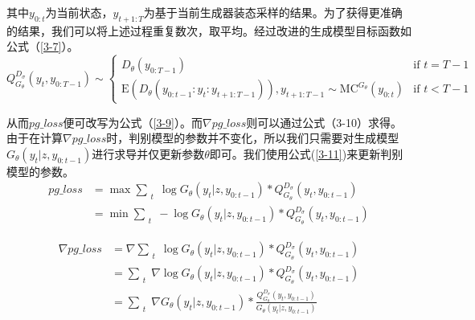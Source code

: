 其中$y_{0:t}$为当前状态，$y_{t+1:T}$为基于当前生成器装态采样的结果。为了获得更准确的结果，我们可以将上述过程重复数次，取平均。经过改进的生成模型目标函数如公式（\ref{3-7}）。
\begin{equation}\label{3-7}
Q_{G_\theta}^{D_\sigma}(y_t,y_{0:T-1})\sim 
\begin{cases}
    D_\theta(y_{0:T-1}) & \text{if } t =T-1 \\
    \mathrm{E}(D_\theta(y_{0:t-1}:y_t:y_{t+1:T-1})),y_{t+1:T-1}\sim \mathrm{MC}^{G_\theta}(y_{0:t}) & \text{if }t<T-1
\end{cases}
\end{equation}

从而$pg\_loss$便可改写为公式（\ref{3-9}）。而$\nabla pg\_loss$则可以通过公式（3-10）求得。由于在计算$\nabla pg\_loss$时，判别模型的参数并不变化，所以我们只需要对生成模型$G_\theta (y_t|z,y_{0:t-1})$进行求导并仅更新参数$\theta$即可。我们使用公式(\ref{3-11})来更新判别模型的参数。
\begin{align}\label{3-9}
    pg\_loss &=\mathop{max}\sum_{\substack{t}}\log G_\theta (y_t|z,y_{0:t-1})*Q_{G_\theta}^{D_\sigma} (y_t,y_{0:t-1})\\
             &=\mathop{min}\sum_{\substack{t}}-\log G_\theta (y_t|z,y_{0:t-1})*Q_{G_\theta}^{D_\sigma} (y_t,y_{0:t-1})
\end{align}

\begin{align}\label{3-10}
    \nabla pg\_loss &= \nabla \sum_{\substack{t}}\log G_\theta (y_t|z,y_{0:t-1})*Q_{G_\theta}^{D_\sigma} (y_t,y_{0:t-1})\\
                    &= \sum_{\substack{t}}\nabla\log G_\theta (y_t|z,y_{0:t-1})*Q_{G_\theta}^{D_\sigma} (y_t,y_{0:t-1})\\
                    &= \sum_{\substack{t}}\nabla G_\theta (y_t|z,y_{0:t-1})*\frac{Q_{G_\theta}^{D_\sigma} (y_t,y_{0:t-1})}{G_\theta (y_t|z,y_{0:t-1})}
\end{align}

